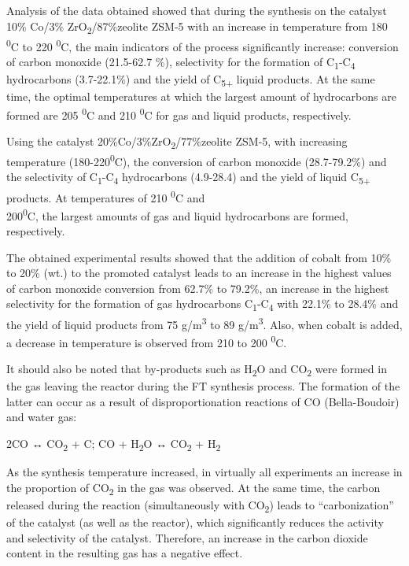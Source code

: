 Analysis of the data obtained showed that during the synthesis on the
catalyst\\
10\% Co/3\% ZrO\textsubscript{2}/87\%zeolite ZSM-5 with an increase in
temperature from 180 \textsuperscript{0}C to 220 \textsuperscript{0}C,
the main indicators of the process significantly increase: conversion of
carbon monoxide (21.5-62.7 \%), selectivity for the formation of
C\textsubscript{1}-C\textsubscript{4} hydrocarbons (3.7-22.1\%) and the
yield of C\textsubscript{5+} liquid products. At the same time, the
optimal temperatures at which the largest amount of hydrocarbons are
formed are 205 \textsuperscript{0}C and 210 \textsuperscript{0}C for gas
and liquid products, respectively.

Using the catalyst 20\%Co/3\%ZrO\textsubscript{2}/77\%zeolite ZSM-5,
with increasing temperature (180-220\textsuperscript{0}C), the
conversion of carbon monoxide (28.7-79.2\%) and the selectivity of
C\textsubscript{1}-C\textsubscript{4} hydrocarbons (4.9-28.4) and the
yield of liquid C\textsubscript{5+} products. At temperatures of 210
\textsuperscript{0}C and\\
200\textsuperscript{0}C, the largest amounts of gas and liquid
hydrocarbons are formed, respectively.

The obtained experimental results showed that the addition of cobalt
from 10\% to 20\% (wt.) to the promoted catalyst leads to an increase in
the highest values \hspace{0pt}\hspace{0pt}of carbon monoxide conversion
from 62.7\% to 79.2\%, an increase in the highest selectivity for the
formation of gas hydrocarbons C\textsubscript{1}-C\textsubscript{4} with
22.1\% to 28.4\% and the yield of liquid products from 75
g/m\textsuperscript{3} to 89 g/m\textsuperscript{3}. Also, when cobalt
is added, a decrease in temperature is observed from 210 to 200
\textsuperscript{0}C.

It should also be noted that by-products such as H\textsubscript{2}O and
CO\textsubscript{2} were formed in the gas leaving the reactor during
the FT synthesis process. The formation of the latter can occur as a
result of disproportionation reactions of CO (Bella-Boudoir) and water
gas:

2CO ↔ CO\textsubscript{2} + C; CO + H\textsubscript{2}O ↔
CO\textsubscript{2} + H\textsubscript{2}

As the synthesis temperature increased, in virtually all experiments an
increase in the proportion of CO\textsubscript{2} in the gas was
observed. At the same time, the carbon released during the reaction
(simultaneously with CO\textsubscript{2}) leads to ``carbonization'' of
the catalyst (as well as the reactor), which significantly reduces the
activity and selectivity of the catalyst. Therefore, an increase in the
carbon dioxide content in the resulting gas has a negative effect.


